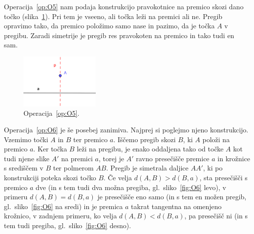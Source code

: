 Operacija~\ref{op:O5} nam podaja konstrukcijo pravokotnice na premico skozi dano točko (slika~\ref{fig:O5}). Pri tem je vseeno, ali točka leži na premici ali ne. Pregib opravimo tako, da premico položimo samo nase in pazimo, da je točka $A$ v pregibu. Zaradi simetrije je pregib res pravokoten na premico in tako tudi en sam.

\begin{figure}[h]
    \centering
    \includegraphics[width=0.35\textwidth]{images/origami_operacije/O5.png}
    \caption[Operacija~\ref{op:O5}]{Operacija~\ref{op:O5}.}
    \label{fig:O5}
\end{figure}

Operacija~\ref{op:O6} je še posebej zanimiva. Najprej si poglejmo njeno konstrukcijo. Vzemimo točki $A$ in $B$ ter premico $a$. Iščemo pregib skozi $B$, ki $A$ položi na premico $a$. Ker točka $B$ leži na pregibu, je enako oddaljena tako od točke $A$ kot tudi njene slike $A'$ na premici $a$, torej je $A'$ ravno presečišče premice $a$ in krožnice s središčem v $B$ ter polmerom $AB$. Pregib je simetrala daljice $AA'$, ki po konstrukciji poteka skozi točko $B$. Če velja $ d(A,B) > d(B,a) $, sta presečišči s premico $a$ dve (in s tem tudi dva možna pregiba, gl.\ sliko~\ref{fig:O6} levo), v primeru $ d(A,B) = d(B,a) $ je presečišče eno samo (in s tem en možen pregib, gl.\ sliko~\ref{fig:O6} na sredi) in je premica $a$ takrat tangentna na omenjeno krožnico, v zadnjem primeru, ko velja $ d(A,B) < d(B,a) $, pa presečišč ni (in s tem tudi pregiba, gl.\ sliko~\ref{fig:O6} desno).

